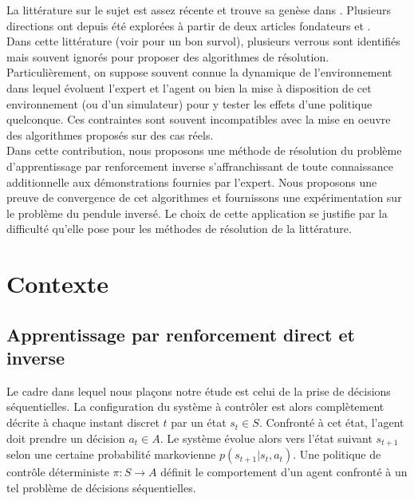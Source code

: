 \documentclass[publibook-draft]{CAp2012}
\begin{document}
La littérature sur le sujet est assez récente et trouve sa genèse dans \cite{russell1998learning}. Plusieurs directions ont depuis été explorées à partir de deux articles fondateurs \cite{ng2000algorithms} et \cite{abbeel2004apprenticeship}.\\
Dans cette littérature (voir \cite{neu2009training} pour un bon survol), plusieurs verrous sont identifiés mais souvent ignorés pour proposer des algorithmes de résolution. Particulièrement, on suppose souvent connue la dynamique de l'environnement dans lequel évoluent l'expert et l'agent ou bien la mise à disposition de cet environnement (ou d'un simulateur) pour y tester les effets d'une politique quelconque. Ces contraintes sont souvent incompatibles avec la mise en oeuvre des algorithmes proposés sur des cas réels.\\

Dans cette contribution, nous proposons une méthode de résolution du problème d'apprentissage par renforcement inverse s'affranchissant de toute connaissance additionnelle aux démonstrations fournies par l'expert. Nous proposons une preuve de convergence de cet algorithmes et fournissons une expérimentation sur le problème du pendule inversé. Le choix de cette application se justifie par la difficulté  qu'elle pose pour les méthodes de résolution de la littérature.  
\section{Contexte}
\label{back.sec}
\subsection{Apprentissage par renforcement direct et inverse}
Le cadre dans lequel nous plaçons notre étude est celui de la prise de décisions séquentielles. La configuration du système à contrôler est alors complètement décrite à chaque instant discret $t$ par un état $s_t \in S$. Confronté à cet état, l'agent doit prendre un décision $a_t\in A$. Le système évolue alors vers l'état suivant $s_{t+1}$ selon une certaine probabilité markovienne $p(s_{t+1}|s_t, a_t)$. Une politique de contrôle déterministe $\pi : S\rightarrow A$ définit le comportement d'un agent confronté à un tel problème de décisions séquentielles.\\
\end{document}
